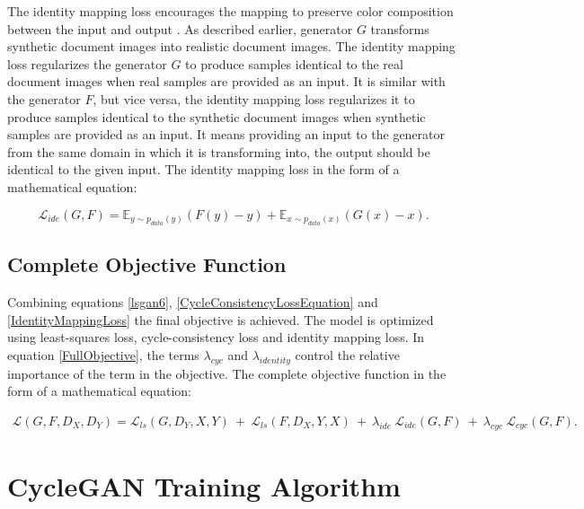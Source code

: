 The identity mapping loss encourages the mapping to preserve color composition between the input and output \cite{taigman2016unsupervised}. As described earlier, generator $G$ transforms synthetic document images into realistic document images. The identity mapping loss regularizes the generator $G$ to produce samples identical to the real document images when real samples are provided as an input. It is similar with the generator $F$, but vice versa, the identity mapping loss regularizes it to produce samples identical to the synthetic document images when synthetic samples are provided as an input. It means providing an input to the generator from the same domain in which it is transforming into, the output should be identical to the given input. The identity mapping loss in the form of a mathematical equation:

\begin{equation}\label{IdentityMappingLoss}
    \mathcal{L}_{ide}(G, F) = \mathbb{E}_{y \sim p_{data}(y)}(F(y) - y) + \mathbb{E}_{x \sim p_{data}(x)}(G(x) - x).
    \end{equation}

\subsection{Complete Objective Function}

Combining equations \ref{lsgan6}, \ref{CycleConsistencyLossEquation} and \ref{IdentityMappingLoss} the final objective is achieved. The model is optimized using least-squares loss, cycle-consistency loss and identity mapping loss. In equation \ref{FullObjective}, the terms $\lambda_{cyc}$ and $\lambda_{identity}$ control the relative importance of the term in the objective. The complete objective function in the form of a mathematical equation:

\begin{equation}\label{FullObjective}
\begin{aligned}
    \mathcal{L}(G, F, D_X, D_Y) =  \mathcal{L}_{ls}(G, D_Y, X, Y)\ +\ \mathcal{L}_{ls}(F, D_X, Y, X)\ +\ 
    \lambda_{ide}\ \mathcal{L}_{ide}(G, F)\ +\ \lambda_{cyc}\ \mathcal{L}_{cyc}(G, F).
\end{aligned}
\end{equation}
    

\section{\ac{CycleGAN} Training Algorithm}\label{CycleGANAlgorithm}

